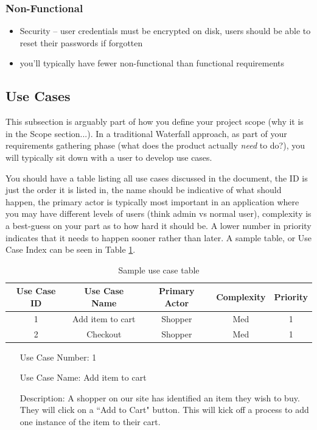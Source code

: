 \documentclass[10pt,conference,onecolumn,compsoc]{IEEEtran}
\begin{document}
\subsubsection{Non-Functional}
\begin{itemize}
\item Security -- user credentials must be encrypted on disk, users should be able to reset their passwords if forgotten
\item you'll typically have fewer non-functional than functional requirements
\end{itemize}

\subsection{Use Cases}
This subsection is arguably part of how you define your project scope (why it is in the Scope section...).  In a traditional Waterfall approach, as part of your requirements gathering phase (what does the product actually \emph{need} to do?), you will typically sit down with a user to develop use cases.

You should have a table listing all use cases discussed in the document, the ID is just the order it is listed in, the name should be indicative of what should happen, the primary actor is typically most important in an application where you may have different levels of users (think admin vs normal user), complexity is a best-guess on your part as to how hard it should be.  A lower number in priority indicates that it needs to happen sooner rather than later.  A sample table, or Use Case Index can be seen in Table \ref{tab:useCaseIndex}.




\begin{table}
\centering
\begin{tabular}{|c|c|c|c|c|}
\hline
Use Case ID & Use Case Name & Primary Actor & Complexity & Priority \\
\hline \hline
1 & Add item to cart & Shopper & Med & 1\\
\hline
2 & Checkout & Shopper & Med & 1\\
\hline

\end{tabular}
\caption{Sample use case table}
\label{tab:useCaseIndex}
\end{table}


\begin{itemize}
\item[Use Case Number:] 1
\item[Use Case Name:] Add item to cart
\item[Description:] A shopper on our site has identified an item they wish to buy.  They will click on a ``Add to Cart" button.  This will kick off a process to add one instance of the item to their cart.
\end{itemize}
\end{document}

